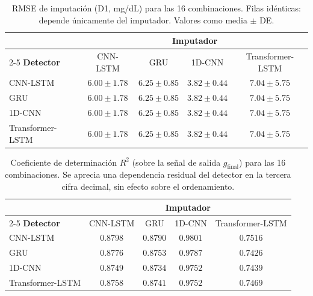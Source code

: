 \documentclass{report}
\begin{document}
\begin{table}[htbp]
\centering
\caption{RMSE de imputación (D1, mg/dL) para las 16 combinaciones. Filas idénticas: depende únicamente del imputador. Valores como media $\pm$ DE.}
\label{tab:44-rmse-d1}
\small
\begin{tabular}{lcccc}
\toprule
 & \multicolumn{4}{c}{\textbf{Imputador}} \\
\cmidrule(lr){2-5}
\textbf{Detector} & CNN-LSTM & GRU & 1D-CNN & Transformer-LSTM \\
\midrule
CNN-LSTM          & $6.00 \pm 1.78$ & $6.25 \pm 0.85$ & $3.82 \pm 0.44$ & $7.04 \pm 5.75$ \\
GRU               & $6.00 \pm 1.78$ & $6.25 \pm 0.85$ & $3.82 \pm 0.44$ & $7.04 \pm 5.75$ \\
1D-CNN            & $6.00 \pm 1.78$ & $6.25 \pm 0.85$ & $3.82 \pm 0.44$ & $7.04 \pm 5.75$ \\
Transformer-LSTM  & $6.00 \pm 1.78$ & $6.25 \pm 0.85$ & $3.82 \pm 0.44$ & $7.04 \pm 5.75$ \\
\bottomrule
\end{tabular}
\end{table}

\begin{table}[H]
\centering
\caption{Coeficiente de determinación $R^2$ (sobre la señal de salida $g_{\text{final}}$) para las 16 combinaciones. Se aprecia una dependencia residual del detector en la tercera cifra decimal, sin efecto sobre el ordenamiento.}
\label{tab:44-r2}
\small
\begin{tabular}{lcccc}
\toprule
 & \multicolumn{4}{c}{\textbf{Imputador}} \\
\cmidrule(lr){2-5}
\textbf{Detector} & CNN-LSTM & GRU & 1D-CNN & Transformer-LSTM \\
\midrule
CNN-LSTM          & $0.8798$ & $0.8790$ & $0.9801$ & $0.7516$ \\
GRU               & $0.8776$ & $0.8753$ & $0.9787$ & $0.7426$ \\
1D-CNN            & $0.8749$ & $0.8734$ & $0.9752$ & $0.7439$ \\
Transformer-LSTM  & $0.8758$ & $0.8741$ & $0.9752$ & $0.7469$ \\
\bottomrule
\end{tabular}
\end{table}
\end{document}
